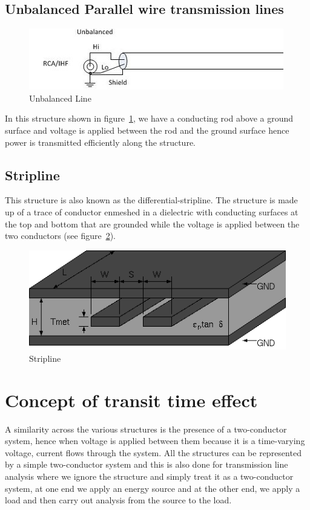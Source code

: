 \subsection{Unbalanced Parallel wire transmission lines}
\begin{figure}[h]
\centering
\includegraphics[width=1\linewidth]{./graphics/Unbalanced}
\caption{Unbalanced Line}
\label{fig:unbalanced}
\end{figure}

In this structure shown in figure~\ref{fig:unbalanced}, we have a conducting rod above a ground surface and voltage is applied between the rod and the ground surface hence power is transmitted efficiently along the structure.

\subsection{Stripline} 
This structure is also known as the differential-stripline. The structure is made up of a trace of conductor enmeshed in a dielectric with conducting surfaces at the top and bottom that are grounded while the voltage is applied between the two conductors (see figure~\ref{fig:stripline}).
\begin{figure}[h]
\centering
\includegraphics[width=1\linewidth]{./graphics/stripline}
\caption{ Stripline}
\label{fig:stripline}
\end{figure}

\section{Concept of transit time effect }
A similarity across the various structures is the presence of a two-conductor system, hence when voltage is applied between them because it is a time-varying voltage, current flows through the system. All the structures can be represented by a simple two-conductor system and this is also done for transmission line analysis where we ignore the structure and simply treat it as a two-conductor system, at one end we apply an energy source and at the other end, we apply a load and then carry out analysis from the source to the load.

